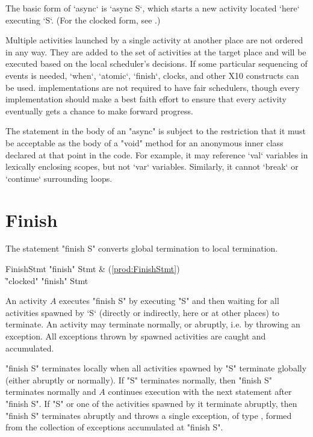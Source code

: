 The basic form of \xcd`async` is \xcd`async S`, which starts a new activity
located \xcd`here` executing \xcd`S`.   (For the clocked form, see
.)  

Multiple activities launched by a single activity at another place are not
ordered in any way. They are added to the set of activities at the target
place and will be executed based on the local scheduler's decisions.
If some particular sequencing of events is needed, \xcd`when`, \xcd`atomic`,
\xcd`finish`, clocks, and other X10 constructs can be used.
\Xten{} implementations are not required to have fair schedulers,
though every implementation should make a best faith effort to ensure
that every activity eventually gets a chance to make forward progress.


The statement in the body of an \xcd"async" is subject to the
restriction that it must be acceptable as the body of a \xcd"void"
method for an anonymous inner class declared at that point in the code. For
example, it may reference \xcd`val` variables in lexically enclosing scopes,
but not \xcd`var` variables.  Similarly, it cannot \xcd`break` or
\xcd`continue` surrounding loops.


\section{Finish}\label{finish}
The statement \xcd"finish S" converts global termination to local
termination.

\begin{bbgrammar}
          FinishStmt \: \xcd"finish" Stmt & (\ref{prod:FinishStmt}) \\
                     \| \xcd"clocked" \xcd"finish" Stmt \\
\end{bbgrammar}

An activity $A$ executes \xcd"finish S" by executing \xcd"S" and
then waiting for all activities spawned by \xcd`S` (directly or
indirectly, here or at other places) to terminate. An activity may
terminate normally, or abruptly, i.e. by throwing an exception.
All exceptions thrown by spawned activities are caught and
accumulated. 

\xcd"finish S" terminates locally when all activities spawned by
\xcd"S" terminate globally (either abruptly or normally). If \xcd"S"
terminates normally, then \xcd"finish S" terminates normally and $A$
continues execution with the next statement after \xcd"finish S".  If
\xcd"S" or one of the activities spawned by it terminate abruptly,
then \xcd"finish S" terminates abruptly and throws a single exception,
of type , formed from the collection of
exceptions accumulated at \xcd"finish S".

